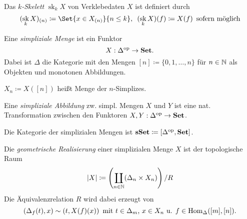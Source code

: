 \documentclass{cheat-sheet}
\DeclareMathOperator{\sk}{sk} %
\begin{document}

\begin{defn}
  Das \emph{$k$-Skelett} $\sk_k X$ von Verklebedaten $X$ ist definiert durch
  \[
    (\sk_k X)_{(n)} \coloneqq
    \Set{ x \in X_{(n)} }{ n \leq k }, \enspace
    (\sk_k X)(f) \coloneqq X(f) \enspace \text{sofern möglich}
  \]
\end{defn}



\begin{defn}
  Eine \emph{simpliziale Menge} ist ein Funktor
  \[ X : \Delta^{\mathrm{op}} \to \mathbf{Set}. \]
  Dabei ist $\Delta$ die Kategorie mit den Mengen
  $[n] \coloneqq \{ 0, 1, \ldots, n \}$ für $n \in \mathbb{N}$ als Objekten und monotonen Abbildungen.
\end{defn}

\begin{nota}
  $X_n \coloneqq X([n])$ heißt Menge der $n$-Simplizes.
\end{nota}

\begin{defn}
  Eine \emph{simpliziale Abbildung} zw. simpl. Mengen $X$ und $Y$ ist eine nat. Transformation zwischen den Funktoren $X, Y : \Delta^{\mathrm{op}} \to \mathbf{Set}$.
\end{defn}

\begin{defn}
  Die Kategorie der simplizialen Mengen ist $\mathbf{sSet} \coloneqq [\Delta^{\mathrm{op}}, \mathbf{Set}]$.
\end{defn}

\begin{defn}
  Die \emph{geometrische Realisierung} einer simplizialen Menge $X$ ist der topologische Raum
  \[ \lvert X\rvert \coloneqq \left( \coprod_{n \in \mathbb{N}} (\Delta_n \times X_{n}) \right) / R \]
  Die Äquivalenzrelation $R$ wird dabei erzeugt von
  \[
    (\Delta_f(t), x) \sim (t, X(f)(x)) \enspace
    \text{mit $t \in \Delta_m$, $x \in X_n$ u. $f \in \operatorname{Hom}_\Delta([m], [n])$.}
  \]
\end{defn}
\end{document}
